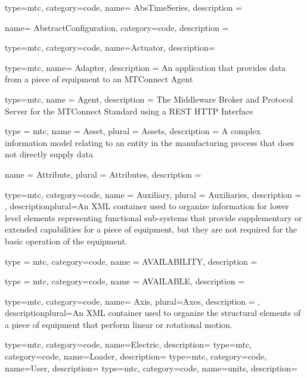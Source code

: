




{
  type=mtc,
  category=code,
  name= {AbsTimeSeries},
  description = {}
}

{
  name= {AbstractConfiguration},
  category=code,
  description = {}
}

{
  type=mtc,
  category=code,
  name={Actuator},
  description={}
}

{
  type=mtc,
  name= {Adapter},
  description = {An application that provides data from a piece of equipment to an MTConnect Agent}
}

{
  type=mtc,
  name = {Agent},
  description = {The Middleware Broker and Protocol Server for the MTConnect Standard using a REST HTTP Interface}
}

{
  type = mtc,
  name = {Asset},
  plural = {Assets},
  description = {A complex information model relating to an entity in the manufacturing process that does not directly supply data}
}

{
  name = {Attribute},
  plural = {Attributes},
  description = {}
}

{
  type=mtc,
  category=code,
  name = {Auxiliary},
  plural = {Auxiliaries},
  description = {},
  descriptionplural={An XML container used to organize information for \gls{lower level} elements representing functional sub-systems that provide supplementary or extended capabilities for a piece of equipment, but they are not required for the basic operation of the equipment.}
}

{
  type = mtc,
  category=code,
  name = {AVAILABILITY},
  description = {}
}

{
  type = mtc,
  category=code,
  name = {AVAILABLE},
  description = {}
}

{
  type=mtc,
  category=code,
  name= {Axis},
  plural={Axes},
  description = {},
  descriptionplural={An XML container used to organize the \glspl{structural element} of a piece of equipment that perform linear or rotational motion.}
}

{
  type=mtc,
  category=code,
  name={Electric},
  description={}
}
{
  type=mtc,
  category=code,
  name={Loader},
  description={}
}
{
  type=mtc,
  category=code,
  name={User},
  description={}
}
{
  type=mtc,
  category=code,
  name={units},
  description={}
}

